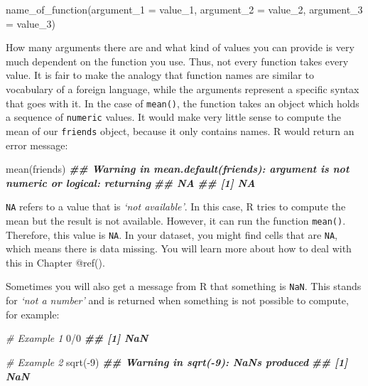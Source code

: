 \documentclass[
]{book}
\newenvironment{Shaded}{\begin{snugshade}}{\end{snugshade}}
\newcommand{\AttributeTok}[1]{\textcolor[rgb]{0.77,0.63,0.00}{#1}}
\newcommand{\CommentTok}[1]{\textcolor[rgb]{0.56,0.35,0.01}{\textit{#1}}}
\newcommand{\DecValTok}[1]{\textcolor[rgb]{0.00,0.00,0.81}{#1}}
\newcommand{\DocumentationTok}[1]{\textcolor[rgb]{0.56,0.35,0.01}{\textbf{\textit{#1}}}}
\newcommand{\FunctionTok}[1]{\textcolor[rgb]{0.00,0.00,0.00}{#1}}
\newcommand{\NormalTok}[1]{#1}
\newcommand{\SpecialCharTok}[1]{\textcolor[rgb]{0.00,0.00,0.00}{#1}}
\begin{document}
\begin{Shaded}
\begin{Highlighting}[]
\FunctionTok{name\_of\_function}\NormalTok{(}\AttributeTok{argument\_1 =}\NormalTok{ value\_1,}
                 \AttributeTok{argument\_2 =}\NormalTok{ value\_2,}
                 \AttributeTok{argument\_3 =}\NormalTok{ value\_3)}
\end{Highlighting}
\end{Shaded}

How many arguments there are and what kind of values you can provide is very much dependent on the function you use. Thus, not every function takes every value. It is fair to make the analogy that function names are similar to vocabulary of a foreign language, while the arguments represent a specific syntax that goes with it. In the case of \texttt{mean()}, the function takes an object which holds a sequence of \texttt{numeric} values. It would make very little sense to compute the mean of our \texttt{friends} object, because it only contains names. R would return an error message:

\begin{Shaded}
\begin{Highlighting}[]
\FunctionTok{mean}\NormalTok{(friends)}
\DocumentationTok{\#\# Warning in mean.default(friends): argument is not numeric or logical: returning}
\DocumentationTok{\#\# NA}
\DocumentationTok{\#\# [1] NA}
\end{Highlighting}
\end{Shaded}

\texttt{NA} refers to a value that is \emph{`not available'}. In this case, R tries to compute the mean but the result is not available. However, it can run the function \texttt{mean()}. Therefore, this value is \texttt{NA}. In your dataset, you might find cells that are \texttt{NA}, which means there is data missing. You will learn more about how to deal with this in Chapter @ref().

Sometimes you will also get a message from R that something is \texttt{NaN}. This stands for \emph{`not a number'} and is returned when something is not possible to compute, for example:

\begin{Shaded}
\begin{Highlighting}[]

\CommentTok{\# Example 1}
\DecValTok{0}\SpecialCharTok{/}\DecValTok{0}
\DocumentationTok{\#\# [1] NaN}

\CommentTok{\# Example 2}
\FunctionTok{sqrt}\NormalTok{(}\SpecialCharTok{{-}}\DecValTok{9}\NormalTok{)}
\DocumentationTok{\#\# Warning in sqrt({-}9): NaNs produced}
\DocumentationTok{\#\# [1] NaN}
\end{Highlighting}
\end{Shaded}
\end{document}
